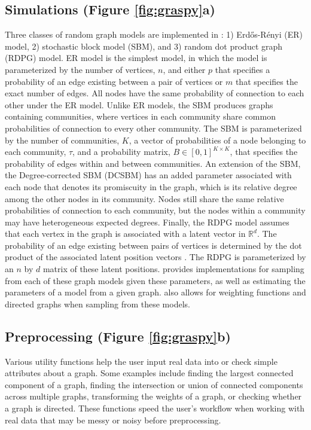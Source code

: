 \subsection{Simulations (Figure \ref{fig:graspy}a)} Three classes of random graph models are implemented in \graspy: 1) Erd\H os-R\'enyi (ER) model, 2) stochastic block model (SBM), and 3) random dot product graph (RDPG) model. ER model is the simplest model, in which the model is parameterized by the number of vertices, $n$, and either $p$ that specifies a probability of an edge existing between a pair of vertices or $m$ that specifies the exact number of edges. All nodes have the same probability of connection to each other under the ER model. Unlike ER models, the SBM produces graphs containing communities, where vertices in each community share common probabilities of connection to every other community. The SBM is parameterized by the number of communities, $K$, a vector of probabilities of a node belonging to each community, $\tau$, and a probability matrix, $B\in[0,1]^{K \times K}$, that specifies the probability of edges within and between communities. An extension of the SBM, the Degree-corrected SBM (DCSBM) has an added parameter associated with each node that denotes its promiscuity in the graph, which is its relative degree among the other nodes in its community. Nodes still share the same relative probabilities of connection to each community, but the nodes within a community may have heterogeneous expected degrees. Finally, the RDPG model assumes that each vertex in the graph is associated with a latent vector in $\mathbb{R}^d$. The probability of an edge existing between pairs of vertices is determined by the dot product of the associated latent position vectors \citep{young2007random}. The RDPG is parameterized by an $n$ by $d$ matrix of these latent positions. \graspy provides implementations for sampling from each of these graph models given these parameters, as well as estimating the parameters of a model from a given graph. \graspy also allows for weighting functions and directed graphs when sampling from these models.

\subsection{Preprocessing (Figure \ref{fig:graspy}b)}
Various utility functions help the user input real data into \graspy or check simple attributes about a graph. Some examples include finding the largest connected component of a graph, finding the intersection or union of connected components across multiple graphs, transforming the weights of a graph, or checking whether a graph is directed. These functions speed the user's workflow when working with real data that may be messy or noisy before preprocessing.


